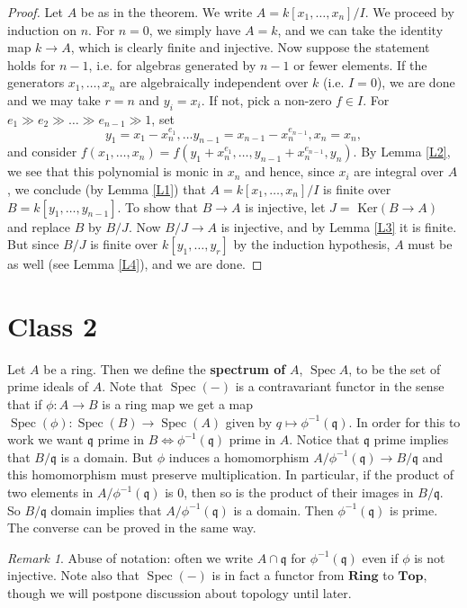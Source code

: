\documentclass{article}
\newcommand{\fr}{\mathfrak}
\DeclareMathOperator{\Spec}{Spec}
\theoremstyle{plain}
\theoremstyle{definition}
\theoremstyle{remark}
\newtheorem*{rem}{Remark}
\begin{document}
\begin{proof}
Let $A$ be as in the theorem. We write $A=k[x_1,\ldots, x_n]/I$. We proceed by induction on $n$. For $n=0$, we simply have $A=k$, and we can take the identity map $k\to A$, which is clearly finite and injective. Now suppose the statement holds for $n-1$, i.e. for algebras generated by $n-1$ or fewer elements. If the generators $x_1,\ldots,x_n$ are algebraically independent over $k$ (i.e. $I=0$), we are done and we may take $r=n$ and $y_i=x_i$. If not, pick a non-zero $f\in I$. For $e_1\gg e_2\gg\ldots\gg e_{n-1}\gg 1$, set
\[y_1=x_1-x_n^{e_1},\ldots y_{n-1}=x_{n-1}-x_n^{e_{n-1}},x_n=x_n,\]
and consider $f(x_1,\ldots, x_n)=f(y_1+x_n^{e_1},\ldots,y_{n-1}+x_n^{e_{n-1}},y_n)$. By  Lemma \ref{L2}, we see that this polynomial is monic in $x_n$ and hence, since $x_i$ are integral over $A$, we conclude (by Lemma \ref{L1}) that $A=k[x_1,\ldots,x_n]/I$ is finite over $B=k[y_1,\ldots, y_{n-1}]$. To show that $B\to A$ is injective, let $J =$ Ker$(B \to A)$ and replace $B$ by $B/J$. Now $B/J \to A$ is injective, and by Lemma \ref{L3} it is finite. But since $B/J$ is finite over $k[y_1,\ldots,y_r]$ by the induction hypothesis, $A$ must be as well (see Lemma \ref{L4}), and we are done.
\end{proof}


\section*{Class 2}

    Let $A$ be a ring. Then we define the \textbf{spectrum of} $A$, $\Spec A$, to be the set of prime ideals of $A$.
    Note that $\Spec(-)$ is a contravariant functor in the sense that if $\phi:A\to B$ is a ring map we get a map $\Spec(\phi):\Spec(B)\to\Spec(A)$ given by $q\mapsto \phi^{-1}(\fr q)$. In order for this to work we want $\fr q$ prime in $B \Leftrightarrow \phi^{-1}(\fr q)$ prime in $A$. Notice that $\fr q$ prime implies that $B/\fr q$ is a domain. But $\phi$ induces a homomorphism $A/\phi^{-1}(\fr q) \to B/\fr q$ and this homomorphism must preserve multiplication. In particular, if the product of two elements in $A/\phi^{-1}(\fr q)$ is 0, then so is the product of their images in $B/\fr q$. So $B/\fr q$ domain implies that $A/\phi^{-1}(\fr q)$ is a domain. Then $\phi^{-1}(\fr q)$ is prime. The converse can be proved in the same way.
    

\begin{rem}
    Abuse of notation: often we write $A\cap \fr q$ for $\phi^{-1}(\fr q)$ even if $\phi$ is not injective. Note also that $\Spec(-)$ is in fact a functor from $\mathbf{Ring}$ to $\mathbf{Top}$, though we will postpone discussion about topology until later.
\end{rem}
\end{document}
